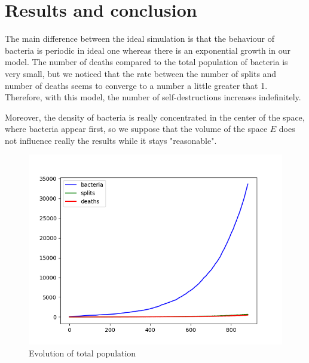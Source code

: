 \documentclass[a4paper]{article}
\theoremstyle{definition}
\begin{document}
\newpage

\section*{Results and conclusion}

The main difference between the ideal simulation is that the behaviour of bacteria is periodic in ideal one whereas there is an exponential growth in our model. The number of deaths compared to the total population of bacteria is very small, but we noticed that the rate between the number of splits and number of deaths seems to converge to a number a little greater that 1. Therefore, with this model, the number of self-destructions increases indefinitely.

Moreover, the density of bacteria is really concentrated in the center of the space, where bacteria appear first, so we suppose that the volume of the space $E$ does not influence really the results while it stays "reasonable".

\begin{figure}[!h]
\centering
\includegraphics[width=1\textwidth]{Figure_3.png}
\caption{Evolution of total population}
\end{figure}
\end{document}

